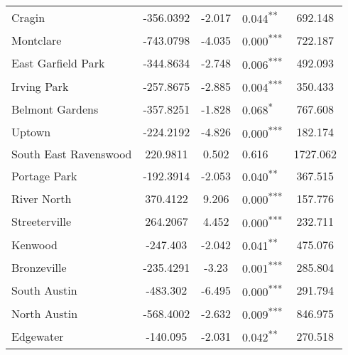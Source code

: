 \documentclass[12pt]{report}
\begin{document}
\begin{longtable}{l S[table-format=6.4] S[table-format=3.4] l S[table-format=4.4]}
	Cragin                       & -356.0392            & -2.017           & 0.044\textsuperscript{**}  & 692.148                           \\
	Montclare                    & -743.0798            & -4.035           & 0.000\textsuperscript{***} & 722.187                           \\
	East Garfield Park           & -344.8634            & -2.748           & 0.006\textsuperscript{***} & 492.093                           \\
	Irving Park                  & -257.8675            & -2.885           & 0.004\textsuperscript{***} & 350.433                           \\
	Belmont Gardens              & -357.8251            & -1.828           & 0.068\textsuperscript{*}   & 767.608                           \\
	Uptown                       & -224.2192            & -4.826           & 0.000\textsuperscript{***} & 182.174                           \\
	South East Ravenswood        & 220.9811             & 0.502            & 0.616                      & 1727.062                          \\
	Portage Park                 & -192.3914            & -2.053           & 0.040\textsuperscript{**}  & 367.515                           \\
	River North                  & 370.4122             & 9.206            & 0.000\textsuperscript{***} & 157.776                           \\
	Streeterville                & 264.2067             & 4.452            & 0.000\textsuperscript{***} & 232.711                           \\
	Kenwood                      & -247.403             & -2.042           & 0.041\textsuperscript{**}  & 475.076                           \\
	Bronzeville                  & -235.4291            & -3.23            & 0.001\textsuperscript{***} & 285.804                           \\
	South Austin                 & -483.302             & -6.495           & 0.000\textsuperscript{***} & 291.794                           \\
	North Austin                 & -568.4002            & -2.632           & 0.009\textsuperscript{***} & 846.975                           \\
	Edgewater                    & -140.095             & -2.031           & 0.042\textsuperscript{**}  & 270.518                           \\

\end{longtable}
\end{document}
